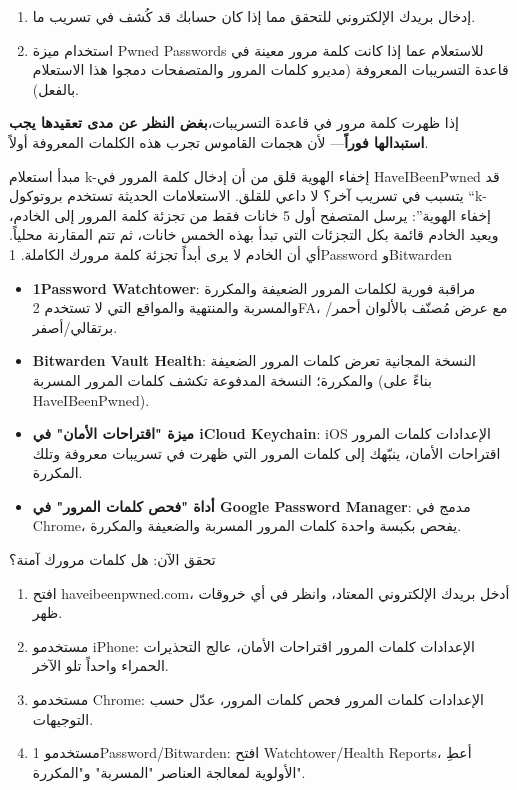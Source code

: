 \begin{enumerate}
  \item إدخال بريدك الإلكتروني للتحقق مما إذا كان حسابك قد كُشف في تسريب ما.
  \item استخدام ميزة Pwned Passwords للاستعلام عما إذا كانت كلمة مرور معينة في قاعدة التسريبات المعروفة (مديرو كلمات المرور والمتصفحات دمجوا هذا الاستعلام بالفعل).
\end{enumerate}

إذا ظهرت كلمة مرور في قاعدة التسريبات،\textbf{بغض النظر عن مدى تعقيدها يجب استبدالها فوراً}— لأن هجمات القاموس تجرب هذه الكلمات المعروفة أولاً.

\begin{tcbinfo}{مبدأ استعلام k-إخفاء الهوية}
قلق من أن إدخال كلمة المرور في HaveIBeenPwned قد يتسبب في تسريب آخر؟ لا داعي للقلق. الاستعلامات الحديثة تستخدم بروتوكول “k-إخفاء الهوية”: يرسل المتصفح أول 5 خانات فقط من تجزئة كلمة المرور إلى الخادم، ويعيد الخادم قائمة بكل التجزئات التي تبدأ بهذه الخمس خانات، ثم تتم المقارنة محلياً. أي أن الخادم لا يرى أبداً تجزئة كلمة مرورك الكاملة. 1Password وBitwarden

\end{tcbinfo}


\begin{itemize}
  \item \textbf{1Password Watchtower}: مراقبة فورية لكلمات المرور الضعيفة والمكررة والمسربة والمنتهية والمواقع التي لا تستخدم 2FA، مع عرض مُصنّف بالألوان أحمر/برتقالي/أصفر.
  \item \textbf{Bitwarden Vault Health}: النسخة المجانية تعرض كلمات المرور الضعيفة والمكررة؛ النسخة المدفوعة تكشف كلمات المرور المسربة (بناءً على HaveIBeenPwned).
  \item \textbf{ميزة "اقتراحات الأمان" في iCloud Keychain}: iOS الإعدادات كلمات المرور اقتراحات الأمان، ينبّهك إلى كلمات المرور التي ظهرت في تسريبات معروفة وتلك المكررة.
  \item \textbf{أداة "فحص كلمات المرور" في Google Password Manager}: مدمج في Chrome، يفحص بكبسة واحدة كلمات المرور المسربة والضعيفة والمكررة.
\end{itemize}

\begin{tcbpractice}{تحقق الآن: هل كلمات مرورك آمنة؟}
\begin{enumerate}
  \item افتح haveibeenpwned.com، أدخل بريدك الإلكتروني المعتاد، وانظر في أي خروقات ظهر.
  \item مستخدمو iPhone: الإعدادات كلمات المرور اقتراحات الأمان، عالج التحذيرات الحمراء واحداً تلو الآخر.
  \item مستخدمو Chrome: الإعدادات كلمات المرور فحص كلمات المرور، عدّل حسب التوجيهات.
  \item مستخدمو 1Password/Bitwarden: افتح Watchtower/Health Reports، أعطِ الأولوية لمعالجة العناصر "المسربة" و"المكررة".
\end{enumerate}

\end{tcbpractice}

